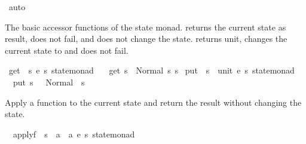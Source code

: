 \begin{isabellebody}
\ auto%
\endisatagproof
{\isafoldproof}%
%
\isadelimproof
%
\endisadelimproof
%
\isadelimdocument
%
\endisadelimdocument
%
\isatagdocument
%
\isamarkuptrue%
%
\endisatagdocument
{\isafolddocument}%
%
\isadelimdocument
%
\endisadelimdocument
%
\begin{isamarkuptext}%
The basic accessor functions of the state monad.  returns
  the current state as result, does not fail, and does not change the state.
   returns unit, changes the current state to  and does not fail.%
\end{isamarkuptext}\isamarkuptrue%
\isamarkupfalse%
\ get\ {\isacharcolon}{\kern0pt}{\isacharcolon}{\kern0pt}\ {\isachardoublequoteopen}{\isacharparenleft}{\kern0pt}{\isacharprime}{\kern0pt}s{\isacharcomma}{\kern0pt}\ {\isacharprime}{\kern0pt}e{\isacharcomma}{\kern0pt}\ {\isacharprime}{\kern0pt}s{\isacharparenright}{\kern0pt}\ state{\isacharunderscore}{\kern0pt}monad{\isachardoublequoteclose}\ \isanewline
\ \ {\isachardoublequoteopen}get\ s\ {\isacharequal}{\kern0pt}\ Normal\ {\isacharparenleft}{\kern0pt}s{\isacharcomma}{\kern0pt}\ s{\isacharparenright}{\kern0pt}{\isachardoublequoteclose}\isanewline
\isanewline
{}\isamarkupfalse%
\ put\ {\isacharcolon}{\kern0pt}{\isacharcolon}{\kern0pt}\ {\isachardoublequoteopen}{\isacharprime}{\kern0pt}s\ {\isasymRightarrow}\ {\isacharparenleft}{\kern0pt}unit{\isacharcomma}{\kern0pt}\ {\isacharprime}{\kern0pt}e{\isacharcomma}{\kern0pt}\ {\isacharprime}{\kern0pt}s{\isacharparenright}{\kern0pt}\ state{\isacharunderscore}{\kern0pt}monad{\isachardoublequoteclose}\ \isanewline
\ \ {\isachardoublequoteopen}put\ s\ {\isacharunderscore}{\kern0pt}\ {\isacharequal}{\kern0pt}\ Normal\ {\isacharparenleft}{\kern0pt}{\isacharparenleft}{\kern0pt}{\isacharparenright}{\kern0pt}{\isacharcomma}{\kern0pt}\ s{\isacharparenright}{\kern0pt}{\isachardoublequoteclose}%
\begin{isamarkuptext}%
Apply a function to the current state and return the result
without changing the state.%
\end{isamarkuptext}\isamarkuptrue%
\isamarkupfalse%
\isanewline
\ \ applyf\ {\isacharcolon}{\kern0pt}{\isacharcolon}{\kern0pt}\ {\isachardoublequoteopen}{\isacharparenleft}{\kern0pt}{\isacharprime}{\kern0pt}s\ {\isasymRightarrow}\ {\isacharprime}{\kern0pt}a{\isacharparenright}{\kern0pt}\ {\isasymRightarrow}\ {\isacharparenleft}{\kern0pt}{\isacharprime}{\kern0pt}a{\isacharcomma}{\kern0pt}\ {\isacharprime}{\kern0pt}e{\isacharcomma}{\kern0pt}\ {\isacharprime}{\kern0pt}s{\isacharparenright}{\kern0pt}\ state{\isacharunderscore}{\kern0pt}monad{\isachardoublequoteclose}\ \isanewline

\end{isabellebody}
